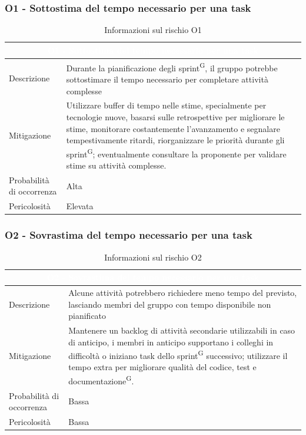 \documentclass[a4paper, 11pt]{article}
\begin{document}
\subsubsection{O1 - Sottostima del tempo necessario per una task}
\begin{table}[H]
    \centering
    \begin{tabular}{|p{}|p{}|}
    	\hline
    	\multicolumn{2}{|c|}{\cellcolor{AccentColor}\textcolor{white}{\textbf{O1 - Sottostima del tempo necessario per una task}}} \\ 
        \hline
        Descrizione & Durante la pianificazione degli sprint\textsuperscript{G}, il gruppo potrebbe sottostimare il tempo necessario per completare attività complesse \\ 
        \hline
        Mitigazione & Utilizzare buffer di tempo nelle stime, specialmente per tecnologie nuove, basarsi sulle retrospettive per migliorare le stime, monitorare costantemente l'avanzamento e segnalare tempestivamente ritardi, riorganizzare le priorità durante gli sprint\textsuperscript{G}; eventualmente consultare la proponente per validare stime su attività complesse. \\ 
        \hline
        Probabilità di occorrenza & Alta \\
        \hline
        Pericolosità & Elevata \\
        \hline
    \end{tabular}
    \caption{Informazioni sul rischio O1}
\end{table}

\subsubsection{O2 - Sovrastima del tempo necessario per una task}
\begin{table}[H]
  \centering
  \begin{tabular}{|p{}|p{}|}
  	\hline
  	\multicolumn{2}{|c|}{\cellcolor{AccentColor}\textcolor{white}{\textbf{O2 - Sovrastima del tempo necessario per una task}}} \\ 
        \hline
        Descrizione & Alcune attività potrebbero richiedere meno tempo del previsto, lasciando membri del gruppo con tempo disponibile non pianificato \\ 
        \hline
        Mitigazione & Mantenere un backlog di attività secondarie utilizzabili in caso di anticipo, i membri in anticipo supportano i colleghi in difficoltà o iniziano task dello sprint\textsuperscript{G} successivo; utilizzare il tempo extra per migliorare qualità del codice, test e documentazione\textsuperscript{G}. \\ 
        \hline
        Probabilità di occorrenza & Bassa \\
        \hline
        Pericolosità & Bassa \\
        \hline
    \end{tabular}
  \caption{Informazioni sul rischio O2}
\end{table}
\end{document}
